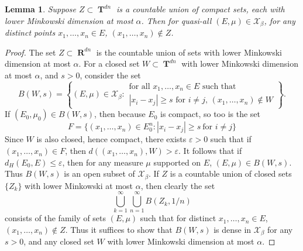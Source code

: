 \documentclass[12pt,reqno]{article}
\numberwithin{equation}{section}
\DeclareMathOperator{\RR}{\mathbf{R}}
\DeclareMathOperator{\TT}{\mathbf{T}}
\newtheorem{lemma}{Lemma}
\begin{document}
\begin{lemma} \label{LemmaVIVIJCIJSIJ}
    Suppose $Z \subset \TT^{dn}$ is a countable union of compact sets, each with lower Minkowski dimension at most $\alpha$. Then for quasi-all $(E,\mu) \in \mathcal{X}_\beta$, for any distinct points $x_1, \dots, x_n \in E$, $(x_1, \dots, x_n) \not \in Z$.
\end{lemma}
\begin{proof}
    The set $Z \subset \RR^{dn}$ is the countable union of sets with lower Minkowski dimension at most $\alpha$. For a closed set $W \subset \TT^{dn}$ with lower Minkowski dimension at most $\alpha$, and $s > 0$, consider the set
    \[ B(W,s) = \left\{ (E,\mu) \in \mathcal{X}_\beta: \begin{array}{c}
            \text{for all $x_1, \dots, x_n \in E$ such that}\\
            \text{$|x_i - x_j| \geq s$ for $i \neq j$, $(x_1, \dots, x_n) \not \in W$}
        \end{array} \right\}. \]
    If $(E_0,\mu_0) \in B(W,s)$, then because $E_0$ is compact, so too is the set
    \[ F = \{ (x_1,\dots,x_n) \in E_0^n : |x_i - x_j| \geq s\ \text{for $i \neq j$} \} \]
    Since $W$ is also closed, hence compact, there exists $\varepsilon > 0$ such that if $(x_1,\dots,x_n) \in F$, then $d((x_1,\dots,x_n),W) > \varepsilon$. It follows that if $d_H(E_0,E) \leq \varepsilon$, then for any measure $\mu$ supported on $E$, $(E,\mu) \in B(W,s)$. Thus $B(W,s)$ is an open subset of $\mathcal{X}_\beta$. If $Z$ is a countable union of closed sets $\{ Z_k \}$ with lower Minkowski at most $\alpha$, then clearly the set
    \[ \bigcup_{k = 1}^\infty \bigcup_{n = 1}^\infty B(Z_k,1/n) \]
    consists of the family of sets $(E,\mu)$ such that for distinct $x_1, \dots, x_n \in E$, $(x_1, \dots, x_n) \not \in Z$. Thus it suffices to show that $B(W,s)$ is dense in $\mathcal{X}_\beta$ for any $s > 0$, and any closed set $W$ with lower Minkowski dimension at most $\alpha$.


\end{proof}
\end{document}
